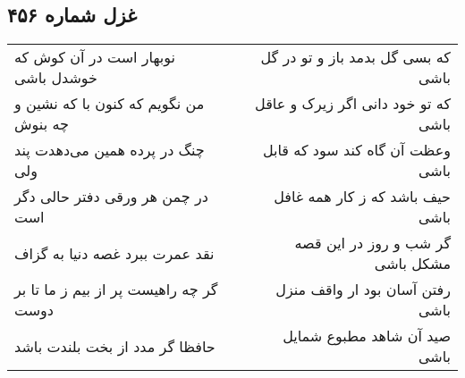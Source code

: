 \begin{center}
\section*{غزل شماره ۴۵۶}
\label{sec:sh456}
\begin{longtable}{l p{0.5cm} r}
نوبهار است در آن کوش که خوشدل باشی
&&
که بسی گل بدمد باز و تو در گل باشی
\\
من نگویم که کنون با که نشین و چه بنوش
&&
که تو خود دانی اگر زیرک و عاقل باشی
\\
چنگ در پرده همین می‌دهدت پند ولی
&&
وعظت آن گاه کند سود که قابل باشی
\\
در چمن هر ورقی دفتر حالی دگر است
&&
حیف باشد که ز کار همه غافل باشی
\\
نقد عمرت ببرد غصه دنیا به گزاف
&&
گر شب و روز در این قصه مشکل باشی
\\
گر چه راهیست پر از بیم ز ما تا بر دوست
&&
رفتن آسان بود ار واقف منزل باشی
\\
حافظا گر مدد از بخت بلندت باشد
&&
صید آن شاهد مطبوع شمایل باشی
\\
\end{longtable}
\end{center}
